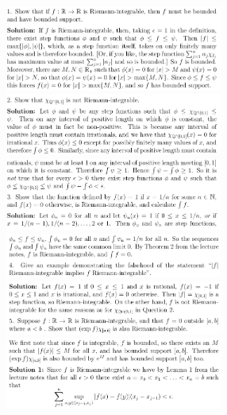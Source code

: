 \documentclass[8pt,landscape]{article}
\begin{document}
\begin{multicols}{3}
    \includegraphics[width=270]{033.png} \\
    \includegraphics[width=270]{034.png} \\
    \includegraphics[width=270]{035.png} \\
    \includegraphics[width=270]{036.png} \\
    \includegraphics[width=270]{037.png} \\
    \includegraphics[width=270]{038.png} \\

\end{multicols}
\end{document}
